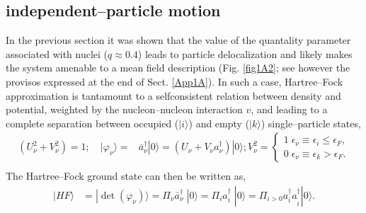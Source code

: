  \subsection{independent--particle motion}\label{C1S1D1}
In the previous section it was shown that the value of the quantality parameter associated with nuclei ($q\approx 0.4$) leads to particle delocalization and likely makes the system amenable to a mean field description (Fig. \ref{fig1A2}; see however the provisos expressed at the end of Sect. \ref{App1A}). In such a case, Hartree--Fock approximation is tantamount to a selfconsistent relation between density and potential, weighted by the nucleon--nucleon interaction $v$, and
  leading to a  complete separation between occupied ($|i\rangle$) and empty ($|k\rangle$) single--particle states,
 \begin{equation}
\begin{split}
\left(U^2_\nu+V_\nu^2\right)=1;\quad |\varphi_\nu\rangle=&\bar a_\nu^{\dagger}|0\rangle=\left(U_\nu+V_\nu a_\nu^{\dagger}\right)|0\rangle; V^2_\nu=\left\{\begin{array}{c}
1\;\epsilon_\nu\equiv\epsilon_i\leq \epsilon_F, \\ 
0\; \epsilon_\nu\equiv\epsilon_k>\epsilon_F.
\end{array}\right.\\ 
\end{split}
\end{equation}
The Hartree--Fock ground state can then be written as, 
 \begin{equation}
\begin{split}
|HF\rangle&=|\det(\varphi_\nu)\rangle=\Pi_\nu \bar a_\nu^{\dagger}\; |0\rangle=\Pi_i a_i^{\dagger}\; |0\rangle=\Pi_{i>0} a_i^{\dagger}a_{\tilde i}^{\dagger}|0\rangle.\\
\end{split}
\end{equation}
